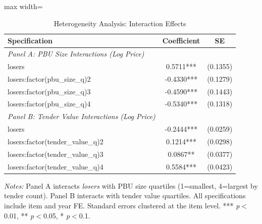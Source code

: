 \begin{table}[htbp]
\centering
\caption{Heterogeneity Analysis: Interaction Effects}
\label{tab:heterogeneity}
\begin{adjustbox}{max width=\textwidth}
\begin{threeparttable}
\small
\begin{tabular}{lcc}
\toprule
Specification & Coefficient & SE \\
\midrule
\textit{Panel A: PBU Size Interactions (Log Price)} & & \\
\quad losers & 0.5711*** & (0.1355) \\
\quad losers:factor(pbu\_size\_q)2 & -0.4330*** & (0.1279) \\
\quad losers:factor(pbu\_size\_q)3 & -0.4590*** & (0.1443) \\
\quad losers:factor(pbu\_size\_q)4 & -0.5340*** & (0.1318) \\
[6pt]
\textit{Panel B: Tender Value Interactions (Log Price)} & & \\
\quad losers & -0.2444*** & (0.0259) \\
\quad losers:factor(tender\_value\_q)2 & 0.1214*** & (0.0298) \\
\quad losers:factor(tender\_value\_q)3 & 0.0867** & (0.0377) \\
\quad losers:factor(tender\_value\_q)4 & 0.5584*** & (0.0423) \\
\bottomrule
\end{tabular}
\begin{tablenotes}
\small
\item \textit{Notes:} Panel A interacts \textit{losers} with PBU size quartiles
(1=smallest, 4=largest by tender count). Panel B interacts with tender value quartiles.
All specifications include item and year FE. Standard errors clustered at the item level.
*** \textit{p}$<$0.01, ** \textit{p}$<$0.05, * \textit{p}$<$0.1.
\end{tablenotes}
\end{threeparttable}
\end{adjustbox}
\end{table}
